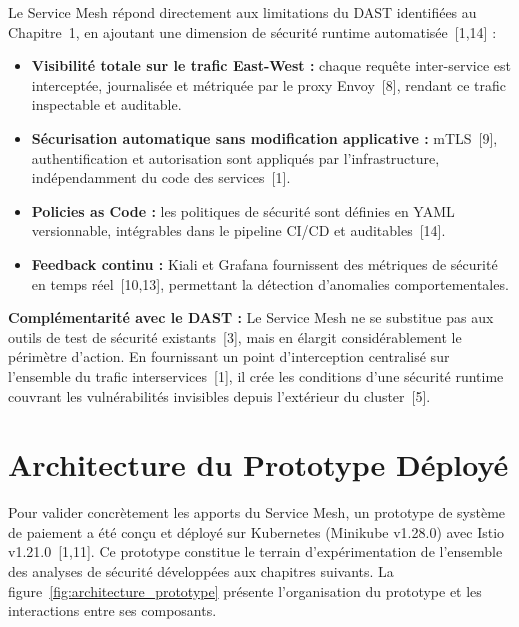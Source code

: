 Le Service Mesh répond directement aux limitations du DAST identifiées au
Chapitre~1, en ajoutant une dimension de sécurité runtime automatisée~[1,14] :

\begin{itemize}[topsep=4pt, itemsep=3pt]
  \item \textbf{Visibilité totale sur le trafic East-West :} chaque requête
        inter-service est interceptée, journalisée et métriquée par le proxy
        Envoy~[8], rendant ce trafic inspectable et auditable.

  \item \textbf{Sécurisation automatique sans modification applicative :}
        mTLS~[9], authentification et autorisation sont appliqués par
        l'infrastructure, indépendamment du code des services~[1].

  \item \textbf{Policies as Code :} les politiques de sécurité sont définies en
        YAML versionnable, intégrables dans le pipeline CI/CD et auditables~[14].

  \item \textbf{Feedback continu :} Kiali et Grafana fournissent des métriques
        de sécurité en temps réel~[10,13], permettant la détection d'anomalies
        comportementales.
\end{itemize}

\noindent
\textbf{Complémentarité avec le DAST :} Le Service Mesh ne se substitue pas aux
outils de test de sécurité existants~[3], mais en élargit considérablement le
périmètre d'action. En fournissant un point d'interception centralisé sur
l'ensemble du trafic interservices~[1], il crée les conditions d'une sécurité
runtime couvrant les vulnérabilités invisibles depuis l'extérieur du cluster~[5].

\section{Architecture du Prototype Déployé}

Pour valider concrètement les apports du Service Mesh, un prototype de système
de paiement a été conçu et déployé sur Kubernetes (Minikube v1.28.0) avec
Istio v1.21.0~[1,11]. Ce prototype constitue le terrain d'expérimentation de
l'ensemble des analyses de sécurité développées aux chapitres suivants. La
figure~\ref{fig:architecture_prototype} présente l'organisation du prototype et
les interactions entre ses composants.


